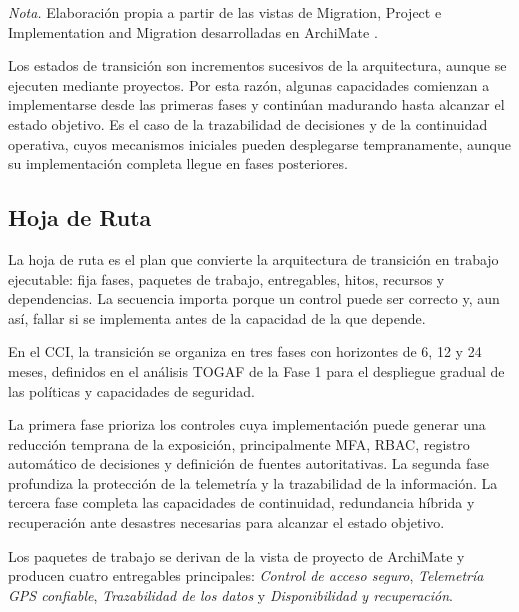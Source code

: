 \begin{table}[H]
\begin{tabularx}{\textwidth}{
			>{\raggedright\arraybackslash}p{2.2cm}
			>{\raggedright\arraybackslash}X
			>{\raggedright\arraybackslash}X}
		\bottomrule
	\end{tabularx}

	\begin{minipage}{0.96\textwidth}
		\footnotesize
		\textit{Nota.} Elaboración propia a partir de las vistas de Migration, Project e
		Implementation and Migration desarrolladas en ArchiMate \parencite{archimate2022,modeloArchimateCCI2026}.
	\end{minipage}
\end{table}

Los estados de transición son incrementos sucesivos
de la arquitectura, aunque se ejecuten mediante proyectos. Por esta razón, algunas capacidades comienzan a implementarse desde las
primeras fases y continúan madurando hasta alcanzar el estado objetivo. Es el caso de la
trazabilidad de decisiones y de la continuidad operativa, cuyos mecanismos iniciales pueden
desplegarse tempranamente, aunque su implementación completa llegue en fases posteriores.


\subsection{Hoja de Ruta}

La hoja de ruta es el plan que convierte la arquitectura de transición en trabajo ejecutable: fija fases, paquetes de trabajo, entregables, hitos, recursos y dependencias. La secuencia importa porque un control puede ser correcto y, aun así, fallar si se implementa antes de la capacidad de la que depende.

En el CCI, la transición se organiza en tres fases con horizontes de 6, 12 y 24
meses, definidos en el análisis TOGAF de la Fase 1 \parencite{fase1cci2026} para el despliegue gradual de las políticas y capacidades de
seguridad.

La primera fase prioriza los controles cuya implementación puede generar una reducción
temprana de la exposición, principalmente MFA, RBAC, registro automático de decisiones y
definición de fuentes autoritativas. La segunda fase profundiza la protección de la telemetría y
la trazabilidad de la información. La tercera fase completa las capacidades de
continuidad, redundancia híbrida y recuperación ante desastres necesarias para alcanzar el
estado objetivo.

Los paquetes de trabajo se derivan de la vista de proyecto de ArchiMate y producen cuatro
entregables principales: \textit{Control de acceso seguro}, \textit{Telemetría GPS confiable},
\textit{Trazabilidad de los datos} y \textit{Disponibilidad y recuperación}.

